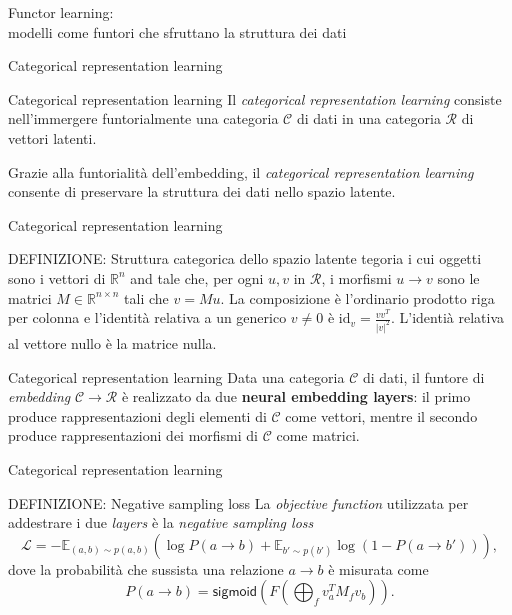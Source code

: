 \documentclass{beamer}
\begin{document}
\begin{frame}[standout]
    \huge Functor learning: \\\large modelli come funtori che sfruttano la struttura dei dati
\end{frame}

\begin{frame}{Categorical representation learning}
    \begin{block}{Categorical representation learning}
        Il \textit{categorical representation learning} consiste nell'immergere funtorialmente una categoria $\mathcal{C}$ di dati in una categoria $\mathcal{R}$ di vettori latenti.
    \end{block}

    Grazie alla funtorialità dell'embedding, il \textit{categorical representation learning} consente di preservare la struttura dei dati nello spazio latente.
\end{frame}

\begin{frame}{Categorical representation learning}
    \begin{block}{DEFINIZIONE: Struttura categorica dello spazio latente}
        tegoria i cui oggetti sono i vettori di $\mathbb{R}^n$ and tale che, per ogni $u,v$ in $\mathcal{R}$, 
        i morfismi $u \to v$ sono le matrici $M \in \mathbb{R}^{n \times n}$ tali che $v = Mu$. La composizione è l'ordinario prodotto riga per colonna e l'identità relativa a un generico $v \neq 0$ è $\mathrm{id}_v = \frac{vv^T}{|v|^2}$. L'identià relativa al vettore nullo è la matrice nulla.
    \end{block}
\end{frame}

\begin{frame}{Categorical representation learning}
    Data una categoria $\mathcal{C}$ di dati, il funtore di \textit{embedding} $\mathcal{C} \to \mathcal{R}$ è realizzato da due \textbf{neural embedding layers}: il primo produce rappresentazioni degli elementi di $\mathcal{C}$ come vettori, mentre il secondo produce rappresentazioni dei morfismi di $\mathcal{C}$ come matrici.
\end{frame}

\begin{frame}{Categorical representation learning}

    \begin{block}{DEFINIZIONE: Negative sampling loss}
        La \textit{objective function} utilizzata per addestrare i due \textit{layers} è la \textit{negative sampling loss}
        \[\mathcal{L} = -\mathbb{E}_{(a,b) \sim p(a,b)}\left(\log P(a \to b) + \mathbb{E}_{b' \sim p(b')}\log (1-P(a \to b'))\right),\]
        dove la probabilità che sussista una relazione $a \to b$ è misurata come
        \[P(a \to b) = \mathsf{sigmoid}\left(F\left(\bigoplus_f v_a^TM_fv_b \right)\right).\]
    \end{block}
    
\end{frame}
\end{document}
